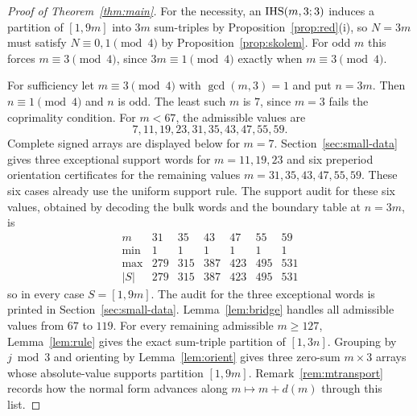 \begin{proof}[Proof of Theorem~\ref{thm:main}]
For the necessity, an $\mathrm{IHS}(m,3;3)$ induces a partition of $[1,9m]$ into $3m$ sum-triples by
Proposition~\ref{prop:red}\textup{(i)}, so $N=3m$ must satisfy $N\equiv0,1\pmod4$ by
Proposition~\ref{prop:skolem}. For odd $m$ this forces $m\equiv3\pmod4$, since $3m\equiv1\pmod4$
exactly when $m\equiv3\pmod4$.

For sufficiency let $m\equiv3\pmod4$ with $\gcd(m,3)=1$ and put $n=3m$. Then $n\equiv1\pmod4$ and
$n$ is odd. The least such $m$ is $7$, since $m=3$ fails the coprimality condition.
For $m<67$, the admissible values are
\[
 7,11,19,23,31,35,43,47,55,59.
\]
Complete signed arrays are displayed below for $m=7$. Section~\ref{sec:small-data} gives three
exceptional support words for $m=11,19,23$ and six preperiod orientation certificates for the
remaining values $m=31,35,43,47,55,59$. These six cases already use the uniform support rule.
The support audit for these six values, obtained by decoding the bulk words and the boundary
table at $n=3m$, is
\[
\begin{array}{c|rrrrrr}
m&31&35&43&47&55&59\\
\min&1&1&1&1&1&1\\
\max&279&315&387&423&495&531\\
|S|&279&315&387&423&495&531
\end{array}
\]
so in every case $S=[1,9m]$. The audit for the three exceptional words is printed in
Section~\ref{sec:small-data}.
Lemma~\ref{lem:bridge} handles all admissible values from $67$ to $119$.
For every remaining admissible $m\ge127$,
Lemma~\ref{lem:rule} gives the exact sum-triple partition of $[1,3n]$. Grouping by $j\bmod3$ and
orienting by Lemma~\ref{lem:orient} gives three zero-sum $m\times3$ arrays whose absolute-value
supports partition $[1,9m]$. Remark~\ref{rem:mtransport} records how the normal form advances
along $m\mapsto m+d(m)$ through this list.
\end{proof}

